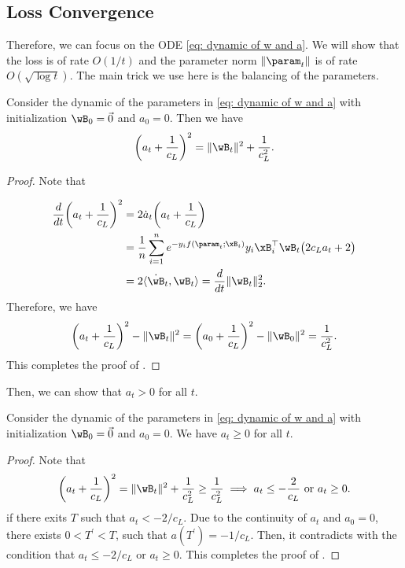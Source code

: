 \subsection{Loss Convergence}  \label{sec:proof:eg-loss}

Therefore, we can focus on the ODE \eqref{eq: dynamic of w and a}. We will show that the loss is of rate $O(1/t)$ and the parameter norm $\|\param_t\|$ is of rate $O(\sqrt{\log t})$. The main trick we use here is the balancing of the parameters.


\begin{lemma}
\label{lem: Parameter balancing} 
Consider the dynamic of the parameters in \eqref{eq: dynamic of w and a} with initialization $\wB_0 = \vec 0$ and $a_0=0$. Then we have
\begin{equation}
\label{eq: balancing}
    \bigg(a_t + \frac{1}{c_L} \bigg)^2 = \| \wB_t\|^2 + \frac{1}{c_L^2}. 
\end{equation}

\end{lemma}

\begin{proof}
Note that 

\begin{align*}
    \frac{d}{dt} \bigg (a_t + \frac{1}{c_L}\bigg)^2 
    & = 2 \dot a_t \bigg(a_t + \frac{1}{c_L}\bigg) \\
    & = \frac{1}{n} \sum_{i=1}^n e^{-y_i f(\param_t;\xB_i)} y_i \xB_i^\top \wB_t\big(2c_La_t + 2\big)\\ 
    & = 2 \langle \dot \wB_t, \wB_t \rangle = \frac{d}{dt} \|\wB_t\|_2^2. 
\end{align*}
Therefore, we have 
\[
    \bigg(a_t + \frac{1}{c_L} \bigg)^2 - \| \wB_t\|^2  = \bigg(a_0 + \frac{1}{c_L} \bigg)^2 - \| \wB_0\|^2  = \frac{1}{c_L^2}. 
\]
This completes the proof of .
\end{proof}

Then, we can show that $a_t>0$ for all $t$. 


\begin{lemma}
[Positiveness of $a_t$]
\label{lem: positiveness of a_t }
Consider the dynamic of the parameters in \eqref{eq: dynamic of w and a} with initialization $\wB_0 = \vec 0$ and $a_0=0$. We have $a_t\ge 0$ for all $t$. 
\end{lemma}
\begin{proof}
Note that 
\[
    \bigg(a_t + \frac{1}{c_L} \bigg)^2 = \| \wB_t\|^2 + \frac{1}{c_L^2} \ge \frac{1}{c_L^2} \implies a_t \le -\frac{2}{c_L} \text{ or } a_t \ge 0.  
\]
if there exits $T$ such that $a_t< - 2/ c_L$. Due to the continuity of $a_t$ and $a_0=0$, there exists $0<T^\prime <T$, such that $a(T^\prime) = -1/c_L$. Then, it contradicts with the condition that $ a_t\le -2/c_L \text{ or } a_t \ge 0$. This completes the proof of .
\end{proof}

